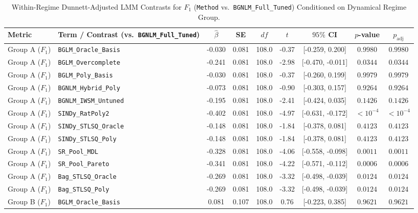 \begin{table}[t]
\centering
\caption{Within-Regime Dunnett-Adjusted LMM Contrasts for $F_1$ (\texttt{Method} vs.\ \texttt{BGNLM\_Full\_Tuned}) Conditioned on Dynamical Regime Group.}
\label{tab:within_regime_contrasts}
\scriptsize
\setlength{\tabcolsep}{3.5pt}
\renewcommand{\arraystretch}{0.88}
\begin{tabular}{llccccccc}
\toprule
Metric & Term / Contrast (vs.\ \texttt{BGNLM\_Full\_Tuned}) & $\hat{\beta}$ & SE & $df$ & $t$ & $95\%$ CI & $p$-value & $p_{\text{adj}}$ \\
\midrule
Group A ($F_1$) & \texttt{BGLM\_Oracle\_Basis} & -0.030 & 0.081 & 108.0 & -0.37 & [-0.259, 0.200] & $0.9980$ & $0.9980$ \\
Group A ($F_1$) & \texttt{BGLM\_Overcomplete} & -0.241 & 0.081 & 108.0 & -2.98 & [-0.470, -0.011] & $0.0344$ & $0.0344$ \\
Group A ($F_1$) & \texttt{BGLM\_Poly\_Basis} & -0.030 & 0.081 & 108.0 & -0.37 & [-0.260, 0.199] & $0.9979$ & $0.9979$ \\
Group A ($F_1$) & \texttt{BGNLM\_Hybrid\_Poly} & -0.073 & 0.081 & 108.0 & -0.90 & [-0.303, 0.157] & $0.9264$ & $0.9264$ \\
Group A ($F_1$) & \texttt{BGNLM\_IWSM\_Untuned} & -0.195 & 0.081 & 108.0 & -2.41 & [-0.424, 0.035] & $0.1426$ & $0.1426$ \\
Group A ($F_1$) & \texttt{SINDy\_RatPoly2} & -0.402 & 0.081 & 108.0 & -4.97 & [-0.631, -0.172] & $< 10^{-4}$ & $< 10^{-4}$ \\
Group A ($F_1$) & \texttt{SINDy\_STLSQ\_Oracle} & -0.148 & 0.081 & 108.0 & -1.84 & [-0.378, 0.081] & $0.4123$ & $0.4123$ \\
Group A ($F_1$) & \texttt{SINDy\_STLSQ\_Poly} & -0.148 & 0.081 & 108.0 & -1.84 & [-0.378, 0.081] & $0.4123$ & $0.4123$ \\
Group A ($F_1$) & \texttt{SR\_Pool\_MDL} & -0.328 & 0.081 & 108.0 & -4.06 & [-0.558, -0.098] & $0.0011$ & $0.0011$ \\
Group A ($F_1$) & \texttt{SR\_Pool\_Pareto} & -0.341 & 0.081 & 108.0 & -4.22 & [-0.571, -0.112] & $0.0006$ & $0.0006$ \\
Group A ($F_1$) & \texttt{Bag\_STLSQ\_Oracle} & -0.269 & 0.081 & 108.0 & -3.32 & [-0.498, -0.039] & $0.0124$ & $0.0124$ \\
Group A ($F_1$) & \texttt{Bag\_STLSQ\_Poly} & -0.269 & 0.081 & 108.0 & -3.32 & [-0.498, -0.039] & $0.0124$ & $0.0124$ \\
\midrule
Group B ($F_1$) & \texttt{BGLM\_Oracle\_Basis} & 0.081 & 0.107 & 108.0 & 0.76 & [-0.223, 0.385] & $0.9621$ & $0.9621$ \\

\end{tabular}
\end{table}
